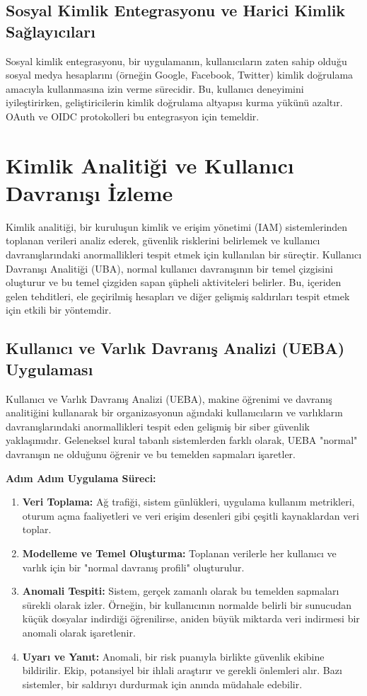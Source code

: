 \subsection{Sosyal Kimlik Entegrasyonu ve Harici Kimlik Sağlayıcıları}

Sosyal kimlik entegrasyonu, bir uygulamanın, kullanıcıların zaten sahip olduğu sosyal medya hesaplarını (örneğin Google, Facebook, Twitter) kimlik doğrulama amacıyla kullanmasına izin verme sürecidir. Bu, kullanıcı deneyimini iyileştirirken, geliştiricilerin kimlik doğrulama altyapısı kurma yükünü azaltır. OAuth ve OIDC protokolleri bu entegrasyon için temeldir.

\section{Kimlik Analitiği ve Kullanıcı Davranışı İzleme}
Kimlik analitiği, bir kuruluşun kimlik ve erişim yönetimi (IAM) sistemlerinden toplanan verileri analiz ederek, güvenlik risklerini belirlemek ve kullanıcı davranışlarındaki anormallikleri tespit etmek için kullanılan bir süreçtir. Kullanıcı Davranışı Analitiği (UBA), normal kullanıcı davranışının bir temel çizgisini oluşturur ve bu temel çizgiden sapan şüpheli aktiviteleri belirler. Bu, içeriden gelen tehditleri, ele geçirilmiş hesapları ve diğer gelişmiş saldırıları tespit etmek için etkili bir yöntemdir.

\subsection{Kullanıcı ve Varlık Davranış Analizi (UEBA) Uygulaması}

Kullanıcı ve Varlık Davranış Analizi (UEBA), makine öğrenimi ve davranış analitiğini kullanarak bir organizasyonun ağındaki kullanıcıların ve varlıkların davranışlarındaki anormallikleri tespit eden gelişmiş bir siber güvenlik yaklaşımıdır. Geleneksel kural tabanlı sistemlerden farklı olarak, UEBA "normal" davranışın ne olduğunu öğrenir ve bu temelden sapmaları işaretler.

\textbf{Adım Adım Uygulama Süreci:}
\begin{enumerate}
    \item \textbf{Veri Toplama:} Ağ trafiği, sistem günlükleri, uygulama kullanım metrikleri, oturum açma faaliyetleri ve veri erişim desenleri gibi çeşitli kaynaklardan veri toplar.
    \item \textbf{Modelleme ve Temel Oluşturma:} Toplanan verilerle her kullanıcı ve varlık için bir "normal davranış profili" oluşturulur.
    \item \textbf{Anomali Tespiti:} Sistem, gerçek zamanlı olarak bu temelden sapmaları sürekli olarak izler. Örneğin, bir kullanıcının normalde belirli bir sunucudan küçük dosyalar indirdiği öğrenilirse, aniden büyük miktarda veri indirmesi bir anomali olarak işaretlenir.
    \item \textbf{Uyarı ve Yanıt:} Anomali, bir risk puanıyla birlikte güvenlik ekibine bildirilir. Ekip, potansiyel bir ihlali araştırır ve gerekli önlemleri alır. Bazı sistemler, bir saldırıyı durdurmak için anında müdahale edebilir.
\end{enumerate}

